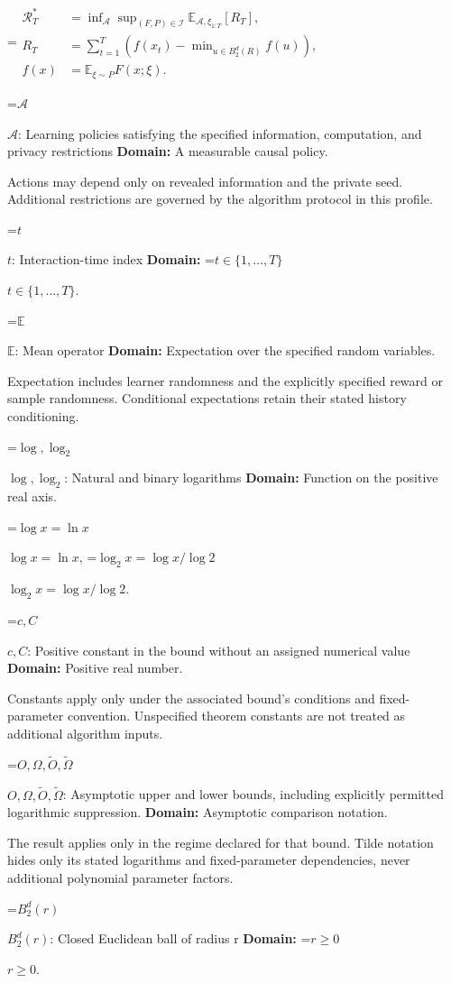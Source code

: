 \documentclass[10pt,a4paper]{article}
\newcommand{\AtlasMath}[1]{\par\begingroup\centering\setbox0=\hbox{$\displaystyle #1$}\ifdim\wd0>1.4\linewidth\typeout{ATLAS WIDE FORMULA: \the\wd0}\fi\ifdim\wd0>\linewidth\resizebox{\linewidth}{!}{\box0}\else\box0\fi\par\endgroup}
\newcommand{\AtlasInlineMath}[1]{\begingroup\setbox0=\hbox{$#1$}\ifdim\wd0>.4\linewidth\endgroup\AtlasMath{#1}\else\endgroup$#1$\fi}
\begin{document}
\AtlasMath{\begin{aligned}\mathcal R_T^*&=\inf_{\mathcal A}\sup_{(F,P)\in\mathcal I}\mathbb E_{\mathcal A,\xi_{1:T}}[R_T],\\ R_T&=\sum_{t=1}^T\left(f(x_t)-\min_{u\in B_2^d(R)}f(u)\right),\\ f(x)&=\mathbb E_{\xi\sim P}F(x;\xi).\end{aligned}}


\AtlasInlineMath{\mathcal A}: Learning policies satisfying the specified information, computation, and privacy restrictions \textbf{Domain:} A measurable causal policy.

Actions may depend only on revealed information and the private seed. Additional restrictions are governed by the algorithm protocol in this profile.

\AtlasInlineMath{t}: Interaction-time index \textbf{Domain:} \AtlasInlineMath{t\in\{1,\ldots,T\}}.

\AtlasInlineMath{\mathbb E}: Mean operator \textbf{Domain:} Expectation over the specified random variables.

Expectation includes learner randomness and the explicitly specified reward or sample randomness. Conditional expectations retain their stated history conditioning.

\AtlasInlineMath{\log,\log_2}: Natural and binary logarithms \textbf{Domain:} Function on the positive real axis.

\AtlasInlineMath{\log x=\ln x}, \AtlasInlineMath{\log_2x=\log x/\log2}.

\AtlasInlineMath{c,C}: Positive constant in the bound without an assigned numerical value \textbf{Domain:} Positive real number.

Constants apply only under the associated bound’s conditions and fixed-parameter convention. Unspecified theorem constants are not treated as additional algorithm inputs.

\AtlasInlineMath{O,\Omega,\widetilde O,\widetilde\Omega}: Asymptotic upper and lower bounds, including explicitly permitted logarithmic suppression. \textbf{Domain:} Asymptotic comparison notation.

The result applies only in the regime declared for that bound. Tilde notation hides only its stated logarithms and fixed-parameter dependencies, never additional polynomial parameter factors.

\AtlasInlineMath{B_2^d(r)}: Closed Euclidean ball of radius r \textbf{Domain:} \AtlasInlineMath{r\ge0}.
\end{document}
